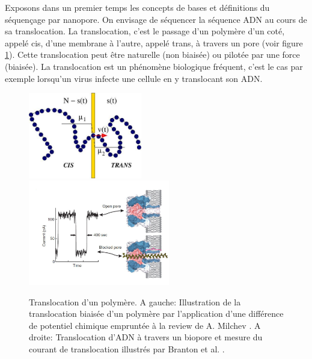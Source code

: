 \documentclass[a4paper,11pt]{article}
\begin{document}
Exposons dans un premier temps les concepts de bases et définitions du séquençage par nanopore. On envisage de séquencer la séquence ADN au cours de sa translocation. La translocation, c'est le passage d'un polymère d'un coté, appelé cis, d'une membrane à l'autre, appelé trans, à travers un pore (voir figure \ref{translocbase}). Cette translocation peut être naturelle (non biaisée) ou pilotée par une force (biaisée). La translocation est un phénomène biologique fréquent, c'est le cas par exemple lorsqu'un virus infecte une cellule en y translocant son ADN.

\begin{figure}[H]
\begin{center}
\includegraphics[width=0.44\textwidth]{translocation.jpg} \includegraphics[width=0.55\textwidth]{translocissues.jpg}

\caption{Translocation d'un polymère. A gauche: Illustration de la translocation biaisée d'un polymère par l'application d'une différence de potentiel chimique empruntée à la review de A. Milchev \cite{Milchev2011}. A droite: Translocation d'ADN à travers un biopore et mesure du courant de translocation illustrés par Branton et al. \cite{Branton2008}.}
\label{translocbase}
\end{center}
\end{figure}
\end{document}
